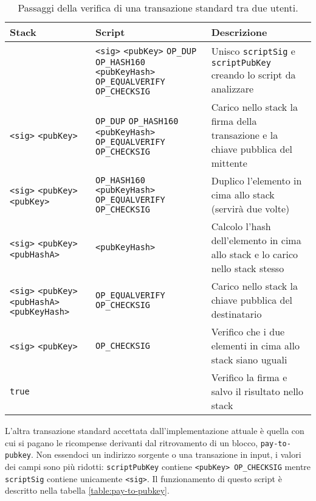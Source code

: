 \begin{table}
  \centering
  \label{table:pay-to-pubkey-hash}
  \begin{tabular}{m{} | m{} | m{}}
    \hline
    Stack&Script&Descrizione \\
    \hline
    \verb||&\verb|<sig>| \verb|<pubKey>| \verb|OP_DUP| \verb|OP_HASH160| \verb|<pubKeyHash>| \verb|OP_EQUALVERIFY| \verb|OP_CHECKSIG|&Unisco \verb|scriptSig| e \verb|scriptPubKey| creando lo script da analizzare  \\ \hline
    \verb|<sig>| \verb|<pubKey>|&\verb|OP_DUP| \verb|OP_HASH160| \verb|<pubKeyHash>| \verb|OP_EQUALVERIFY| \verb|OP_CHECKSIG|&Carico nello stack la firma della transazione e la chiave pubblica del mittente \\ \hline
    \verb|<sig>| \verb|<pubKey>| \verb|<pubKey>|&\verb|OP_HASH160| \verb|<pubKeyHash>| \verb|OP_EQUALVERIFY| \verb|OP_CHECKSIG|&Duplico l'elemento in cima allo stack (servirà due volte) \\ \hline
    \verb|<sig>| \verb|<pubKey>| \verb|<pubHashA>|&\verb|<pubKeyHash>|&Calcolo l'hash dell'elemento in cima allo stack e lo carico nello stack stesso \\ \hline
    \verb|<sig>| \verb|<pubKey>| \verb|<pubHashA>| \verb|<pubKeyHash>|&\verb|OP_EQUALVERIFY| \verb|OP_CHECKSIG|&Carico nello stack la chiave pubblica del destinatario \\ \hline
    \verb|<sig>| \verb|<pubKey>|&\verb|OP_CHECKSIG|&Verifico che i due elementi in cima allo stack siano uguali \\ \hline
    \verb|true|&\verb||&Verifico la firma e salvo il risultato nello stack \\ \hline
  \end{tabular}
  \caption{Passaggi della verifica di una transazione standard tra due utenti.}
\end{table}

L'altra transazione standard accettata dall'implementazione attuale è quella con cui si pagano le ricompense derivanti dal ritrovamento di un blocco, \verb|pay-to-pubkey|. Non essendoci un indirizzo sorgente o una transazione in input, i valori dei campi sono più ridotti: \verb|scriptPubKey| contiene \verb|<pubKey> OP_CHECKSIG| mentre \verb|scriptSig| contiene unicamente \verb|<sig>|. Il funzionamento di questo script è descritto nella tabella \ref{table:pay-to-pubkey}.

